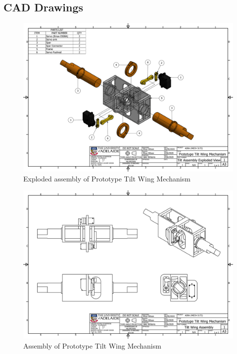 \begin{appendices}
\section{CAD Drawings}
\begin{figure}[H]
    \centering
    \includegraphics[width = \textwidth]{Tiltwing/Tilt Assembly Exploded View.pdf}
    \caption{Exploded assembly of Prototype Tilt Wing Mechanism}
    \label{fig:explode}
\end{figure}

\begin{figure}[H]
    \centering
    \includegraphics[width = \textwidth]{Tiltwing/Tilt Assembly.pdf}
    \caption{Assembly of Prototype Tilt Wing Mechanism}
    \label{fig:assembly}
\end{figure}


\end{appendices}
